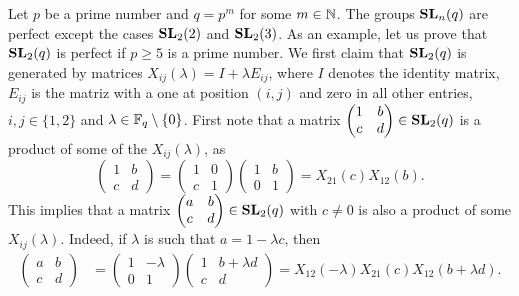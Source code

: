Let $p$ be a prime number and $q=p^m$ for some $m\in\mathbb{N}$.  
The groups $\mathbf{SL}_n(q)$ are perfect except the cases $\mathbf{SL}_2(2)$ and $\mathbf{SL}_2(3)$. As an example,
let us prove that $\mathbf{SL}_2(q)$ is perfect if $p\geq5$ is a prime number. We first 
claim that $\mathbf{SL}_2(q)$ is generated by matrices
$X_{ij}(\lambda)=I+\lambda E_{ij}$, where $I$ denotes the identity matrix, 
$E_{ij}$ is the matriz with a one at position $(i,j)$ and zero in all other entries, 
$i,j\in\{1,2\}$ and $\lambda\in\mathbb{F}_q\setminus\{0\}$. First note that
a matrix $\begin{pmatrix}1&b\\c&d\end{pmatrix}\in\mathbf{SL}_2(q)$ is 
a product of some of the $X_{ij}(\lambda)$, as 
\[
\begin{pmatrix}
1&b\\
c&d	
\end{pmatrix}
=\begin{pmatrix}
1&0\\
c&1
\end{pmatrix}
\begin{pmatrix}
1&b\\
0&1	
\end{pmatrix}
=X_{21}(c)X_{12}(b).
\]
This implies that a matrix $\begin{pmatrix}a&b\\c&d\end{pmatrix}\in\mathbf{SL}_2(q)$ 
with $c\ne 0$ is also a product
of some $X_{ij}(\lambda)$. Indeed, if
$\lambda$ is such that $a=1-\lambda c$, then
\begin{align*}
\begin{pmatrix}
a&b\\
c&d	
\end{pmatrix}
&=\begin{pmatrix}
1&-\lambda\\
0&1	
\end{pmatrix}
\begin{pmatrix}
1&b+\lambda d\\
c&d	
\end{pmatrix}
=X_{12}(-\lambda)X_{21}(c)X_{12}(b+\lambda d).
\end{align*}
